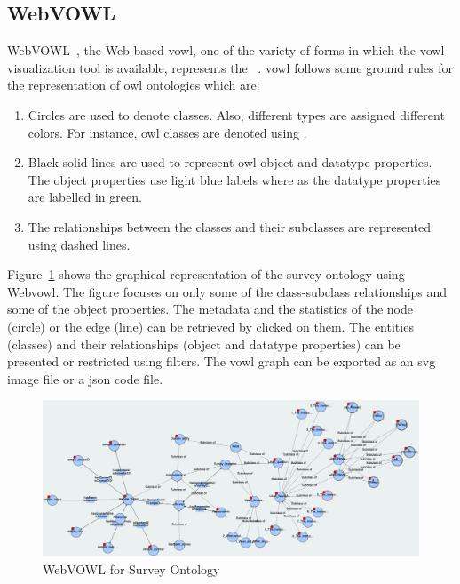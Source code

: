 \begin{doublespace}
\subsection{WebVOWL}
\par WebVOWL~\cite{lohmann2014webvowl}, the Web-based \ac{vowl}, one of the variety of forms in which the \ac{vowl} visualization tool is available, represents the ~\cite{antoniazz2018rdf}. \ac{vowl} follows some ground rules for the representation of \ac{owl} ontologies which are:
\begin{enumerate}
    \item Circles are used to denote classes. Also, different types are assigned different colors. For instance, \ac{owl} classes are denoted using .
    \item Black solid lines are used to represent \ac{owl} object and datatype properties. The object properties use light blue labels where as the datatype properties are labelled in green.
    \item The relationships between the classes and their subclasses are represented using dashed lines.
\end{enumerate}
\par Figure~\ref{fig:4.18} shows the graphical representation of the survey ontology using Web\ac{vowl}. The figure focuses on only some of the class-subclass relationships and some of the object properties. The metadata and the statistics of the node (circle) or the edge (line) can be retrieved by clicked on them. The entities (classes) and their relationships (object and datatype properties) can be presented or restricted using filters. The \ac{vowl} graph can be exported as an \ac{svg} image file or a \ac{json} code file.
\begin{figure}[htp]
    \centering
    \includegraphics[width=15.5cm]{images/ch4/Figure18.png}
    \caption{WebVOWL for Survey Ontology}
    \label{fig:4.18}
\end{figure}
\end{doublespace}